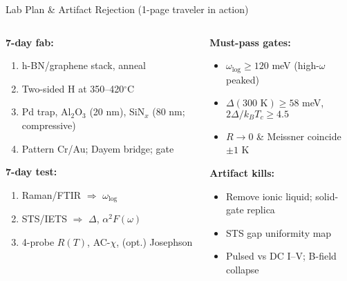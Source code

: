\documentclass[aspectratio=169]{beamer}
\begin{document}
\begin{frame}{Lab Plan \& Artifact Rejection (1-page traveler in action)}
\begin{columns}[T]
\begin{column}{0.55\textwidth}
\textbf{7-day fab:}
\begin{enumerate}
  \item h-BN/graphene stack, anneal
  \item Two-sided H at 350--420$^\circ$C
  \item Pd trap, Al$_2$O$_3$ (20 nm), SiN$_x$ (80 nm; compressive)
  \item Pattern Cr/Au; Dayem bridge; gate
\end{enumerate}
\textbf{7-day test:}
\begin{enumerate}
  \item Raman/FTIR $\Rightarrow$ $\omega_{\log}$
  \item STS/IETS $\Rightarrow$ $\Delta$, $\alpha^2F(\omega)$
  \item 4-probe $R(T)$, AC-$\chi$, (opt.) Josephson
\end{enumerate}
\end{column}
\begin{column}{0.45\textwidth}
\textbf{Must-pass gates:}
\begin{itemize}
  \item $\omega_{\log}\!\ge\!120$ meV (high-$\omega$ peaked)
  \item $\Delta(300\text{ K})\!\ge\!58$ meV, $2\Delta/k_BT_c\!\ge\!4.5$
  \item $R\!\to\!0$ \& Meissner coincide $\pm1$ K
\end{itemize}
\textbf{Artifact kills:}
\begin{itemize}
  \item Remove ionic liquid; solid-gate replica
  \item STS gap uniformity map
  \item Pulsed vs DC I--V; B-field collapse
\end{itemize}
\end{column}
\end{columns}
\end{frame}
\end{document}
